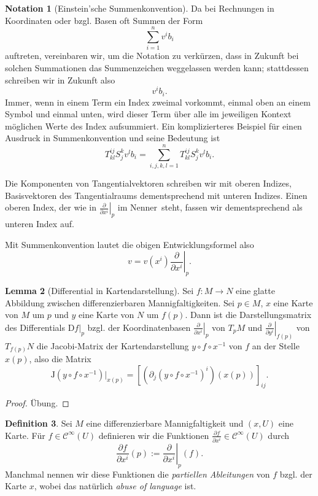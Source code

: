 \documentclass[a4paper]{scrreprt}
\numberwithin{equation}{chapter}
\newcommand{\DD}{\mathrm{D}}
\newcommand{\sC}{\mathcal{C}^{\infty}}
\theoremstyle{definition}
\newtheorem{defn}{Definition}[section]
\newtheorem{lemma}[defn]{Lemma}
\newtheorem{nota}[defn]{Notation}
\newcommand{\bewUeb}{\begin{proof}Übung.\end{proof}}
\begin{document}
\begin{nota}[Einstein'sche Summenkonvention]
	Da bei Rechnungen in Koordinaten oder bzgl. Basen oft Summen der Form
	\[\sum_{i=1}^n v^i b_i\]
	auftreten, vereinbaren wir, um die Notation zu verkürzen, dass in Zukunft bei solchen Summationen das Summenzeichen weggelassen werden kann; stattdessen schreiben wir in Zukunft also
	\[v^i b_i.\]
	Immer, wenn in einem Term ein Index zweimal vorkommt, einmal oben an einem Symbol und einmal unten, wird dieser Term über alle im jeweiligen Kontext möglichen Werte des Index aufsummiert. Ein komplizierteres Beispiel für einen Ausdruck in Summenkonvention und seine Bedeutung ist
	\[T^{ij}_{kl} S^k_j v^l b_i = \sum_{i,j,k,l = 1}^n T^{ij}_{kl} S^k_j v^l b_i.\]

	Die Komponenten von Tangentialvektoren schreiben wir mit oberen Indizes, Basisvektoren des Tangentialraums dementsprechend mit unteren Indizes. Einen oberen Index, der wie in $\left.\frac{\partial}{\partial x^i}\right|_p$ \glqq im Nenner\grqq\ steht, fassen wir dementsprechend als unteren Index auf.

	Mit Summenkonvention lautet die obigen Entwicklungsformel also
	\[v = v(x^i) \left.\frac{\partial}{\partial x^i}\right|_p.\]
\end{nota}

\begin{lemma}[Differential in Kartendarstellung] \label{lemma:differential_koord}
	Sei $f\colon M \to N$ eine glatte Abbildung zwischen differenzierbaren Mannigfaltigkeiten. Sei $p\in M$, $x$ eine Karte von $M$ um $p$ und $y$ eine Karte von $N$ um $f(p)$. Dann ist die Darstellungsmatrix des Differentials $\left.\DD f\right|_p$ bzgl. der Koordinatenbasen $\left.\frac{\partial}{\partial x^i}\right|_p$ von $T_pM$ und $\left.\frac{\partial}{\partial y^i}\right|_{f(p)}$ von $T_{f(p)}N$ die Jacobi-Matrix der Kartendarstellung $y \circ f \circ x^{-1}$ von $f$ an der Stelle $x(p)$, also die Matrix
	\[\mathrm{J}(y\circ f\circ x^{-1})|_{x(p)} = \left[\left(\partial_j(y\circ f\circ x^{-1})^i\right) (x(p)) \right]_{ij}.\]
	\bewUeb
\end{lemma}

\begin{defn}
	Sei $M$ eine differenzierbare Mannigfaltigkeit und $(x,U)$ eine Karte. Für $f \in \sC(U)$ definieren wir die Funktionen $\frac{\partial f}{\partial x^i} \in \sC(U)$ durch
	\[\frac{\partial f}{\partial x^i}(p) := \left.\frac{\partial}{\partial x^i}\right|_p(f).\]
	Manchmal nennen wir diese Funktionen die \emph{partiellen Ableitungen} von $f$ bzgl. der Karte $x$, wobei das natürlich \emph{abuse of language} ist.
\end{defn}
\end{document}
